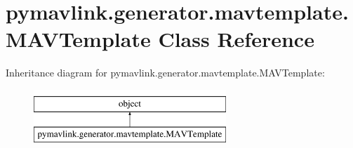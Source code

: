 \hypertarget{classpymavlink_1_1generator_1_1mavtemplate_1_1MAVTemplate}{}\section{pymavlink.\+generator.\+mavtemplate.\+M\+A\+V\+Template Class Reference}
\label{classpymavlink_1_1generator_1_1mavtemplate_1_1MAVTemplate}
Inheritance diagram for pymavlink.\+generator.\+mavtemplate.\+M\+A\+V\+Template\+:\begin{figure}[H]
\begin{center}
\leavevmode
\includegraphics[height=2.000000cm]{classpymavlink_1_1generator_1_1mavtemplate_1_1MAVTemplate}
\end{center}
\end{figure}
